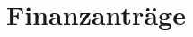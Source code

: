 \newcommand{\finanzantrag}[5]{%
    \subsection{#1}
    Antragssteller: #2
    \paragraph{Antragstext:}\phantom{spacer}\\
    #3
    \paragraph{Antragsbeschreibung:}\phantom{spacer}\\
    #4
    \paragraph{Diskussion:}\phantom{spacer}\\
    #5
}
\section{Finanzanträge}

